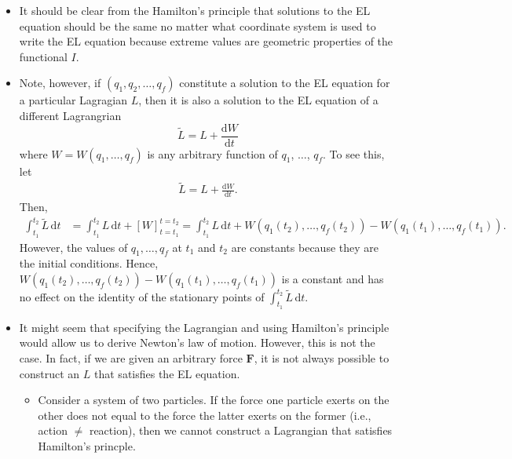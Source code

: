 \documentclass[10pt]{article}
\newcommand{\dee}{\mathrm{d}}
\newcommand{\ve}[1]{\mathbf{#1}}
\begin{document}
\begin{itemize}
\begin{proof}
  		It should be clear that, if we start from a solution where the EL equations are satisified, we can deduce that $(\dee \phi / \dee s)(0) = 0$ for all functions $\eta_j$ by the same argument This establishes the other direction of the theorem.
  	\end{proof}

  	\item It should be clear from the Hamilton's principle that  solutions to the EL equation should be the same no matter what coordinate system is used to write the EL equation because extreme values are geometric properties of the functional $I$.

  	\item Note, however, if $(q_1, q_2, \dotsc, q_f)$ constitute a solution to the EL equation for a particular Lagragian $L$, then it is also a solution to the EL equation of a different Lagrangrian
  	$$\tilde{L} = L + \frac{\dee W}{\dee t}$$
  	where $W = W(q_1, \dotsc, q_f)$ is any arbitrary function of $q_1$, $\dotsc$, $q_f$. To see this, let
  	\begin{align*}
  		\widetilde{L} = L + \frac{\dee W}{\dee t}.  		
  	\end{align*}
  	Then,
  	\begin{align*}
  		\int_{t_1}^{t_2} \widetilde L\, \dee t
  		&= \int_{t_1}^{t_2} L\, \dee t + [W]_{t=t_1}^{t=t_2}
  		=  \int_{t_1}^{t_2} L\, \dee t + W(q_1(t_2), \dotsc, q_f(t_2)) - W(q_1(t_1), \dotsc, q_f(t_1)).
  	\end{align*}
  	However, the values of $q_1, \dotsc, q_f$ at $t_1$ and $t_2$ are constants because they are the initial conditions. Hence, $W(q_1(t_2), \dotsc, q_f(t_2)) - W(q_1(t_1), \dotsc, q_f(t_1))$ is a constant and has no effect on the identity of the stationary points of $\int_{t_1}^{t_2} \widetilde{L}\, \dee t$.

  	\item It might seem that specifying the Lagrangian and using Hamilton's principle would allow us to derive Newton's law of motion. However, this is not the case. In fact, if we are given an arbitrary force $\ve{F}$, it is not always possible to construct an $L$ that satisfies the EL equation.
  	\begin{itemize}
  		\item Consider a system of two particles. If the force one particle exerts on the other does not equal to the force the latter exerts on the former (i.e., action $\neq$ reaction), then we cannot construct a Lagrangian that satisfies Hamilton's princple.


\end{itemize}
\end{itemize}
\end{document}
